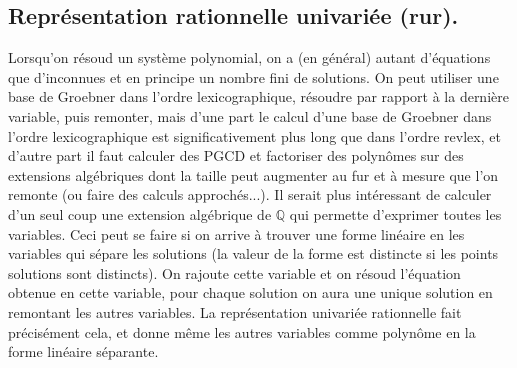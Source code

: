 \documentclass[a4paper,11pt]{article}
\newcommand{\Q}{{\mathbb{Q}}}
\begin{document}


\subsection{Représentation rationnelle univariée 
(rur).}
\label{sec:rur}
Lorsqu'on résoud un système polynomial, on a (en général) autant
d'équations que d'inconnues et en principe un nombre fini de solutions.
On peut utiliser une base de Groebner dans l'ordre lexicographique,
résoudre par rapport à la dernière variable, puis remonter, mais
d'une part le calcul d'une base de Groebner dans l'ordre lexicographique
est significativement plus long que dans l'ordre revlex, et d'autre
part il faut calculer des PGCD et 
factoriser des polynômes sur des extensions algébriques
dont la taille peut augmenter au fur et à mesure que l'on remonte (ou faire
des calculs approchés...). Il serait plus intéressant de calculer
d'un seul coup une extension algébrique de $\Q$ qui permette
d'exprimer toutes les variables. Ceci peut se faire si on arrive à
trouver une forme linéaire en les variables qui sépare
les solutions (la valeur de la forme est distincte si les points
solutions sont distincts). On rajoute cette variable et on résoud
l'équation obtenue en cette variable, pour chaque solution on aura
une unique solution en remontant les autres variables. La représentation
univariée rationnelle fait précisément cela, et donne même les
autres variables comme polynôme en la forme linéaire séparante.
\end{document}
